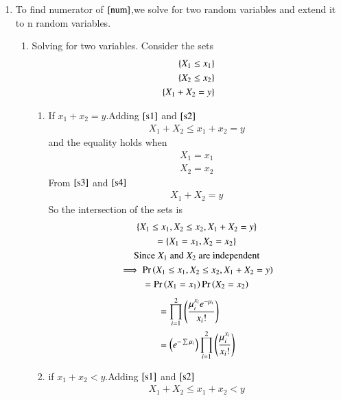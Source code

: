\documentclass[journal,12pt,twocolumn]{IEEEtran}
\begin{document}
\begin{enumerate}
\item To find numerator of $\eqref{num}$,we solve for two random variables and extend it to n random variables.
\begin{enumerate}
    \item Solving for two variables.
    Consider the sets
        \begin{align}
          \left\{X_1\leq x_1\right\} \label{s1}\\
          \left\{X_2\leq x_2\right\} \label{s2}\\
          \left\{X_1+X_2=y\right\}\label{s3}
        \end{align}
    \begin{enumerate}
        \item If $x_1+x_2=y$.Adding $\eqref{s1}$ and $\eqref{s2}$
        \begin{align}
            X_1+X_2 \leq x_1+x_2=y \label{s4}
        \end{align}
         and the equality holds when
        \begin{align}
            X_1=x_1\\
            X_2=x_2
        \end{align}
        From $\eqref{s3}$ and $\eqref{s4}$
        \begin{align}
            X_1+X_2=y
        \end{align}
        So the intersection of the sets is
        \begin{multline}
            \left\{X_1\leq x_1,X_2\leq x_2,X_1+X_2=y\right\}\\
            =\left\{X_1=x_1,X_2=x_2\right\}\\
        \text{Since $X_1$ and $X_2$ are independent}\\
            \implies \Pr\left(X_1\leq x_1,X_2\leq x_2,X_1+X_2=y\right)\\
            =\Pr\left(X_1=x_1\right)\Pr\left(X_2=x_2\right)
        \end{multline}
        \begin{align}
            &=\prod_{i=1}^2\left(\frac{\mu_i^{x_i}e^{-\mu_i}}{x_i!}\right)\\
            &=\left(e^{-\sum\mu_i}\right)\prod_{i=1}^2\left(\frac{\mu_i^{x_i}}{x_i!}\right)
        \end{align}
        \item if $x_1+x_2<y$.Adding $\eqref{s1}$ and $\eqref{s2}$
        \begin{align}
            X_1+X_2 \leq x_1+x_2<y \label{s5}
        \end{align}

\end{enumerate}
\end{enumerate}
\end{enumerate}
\end{document}
